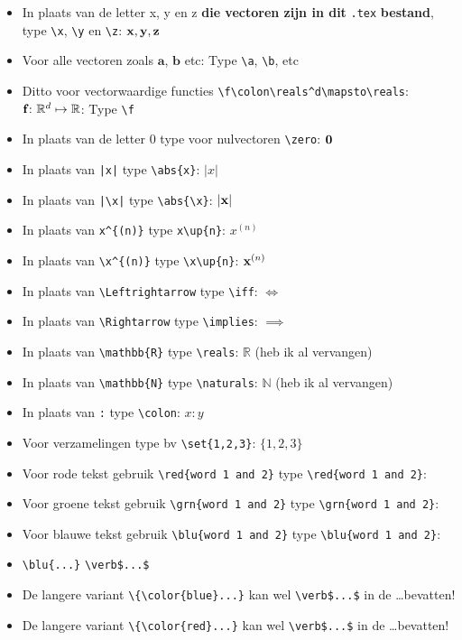 \documentclass[a4paper]{exam}
\theoremstyle{definition}
\newcommand{\naturals}{\mathbb{N}}
\newcommand{\reals}{\mathbb{R}}
\def\set#1{\lbrace#1\rbrace}
\def\abs#1{{\left|#1\right|}}
\def\up#1{^{(#1)}}
\begin{document}
\begin{itemize}
\item In plaats van de letter x, y en z \textbf{die vectoren zijn in dit} \verb$.tex$ \textbf{bestand}, type
\verb$\x$, \verb$\y$ en \verb$\z$: ${\textbf{x}}, {\textbf{y}}, {\textbf{z}}$
\item Voor alle vectoren zoals $\mathbf{a}$, $\mathbf{b}$ etc: Type \verb$\a$, \verb$\b$, etc
\item Ditto voor vectorwaardige functies \verb$\f\colon\reals^d\mapsto\reals$: $\f\colon\reals^d\mapsto\reals$: Type \verb$\f$
\item In plaats van de letter 0 type voor nulvectoren \verb$\zero$: ${\textbf{0}}$
\item In plaats van \verb$|x|$ type \verb$\abs{x}$: $\abs{x}$
\item In plaats van \verb$|\x|$ type \verb$\abs{\x}$: $\abs{\x}$
\item In plaats van \verb$x^{(n)}$ type \verb$x\up{n}$: $x\up{n}$
\item In plaats van \verb$\x^{(n)}$ type \verb$\x\up{n}$: $\x\up{n}$
\item In plaats van \verb$\Leftrightarrow$ type \verb$\iff$: $\iff$
\item In plaats van \verb$\Rightarrow$ type \verb$\implies$: $\implies$
\item In plaats van \verb$\mathbb{R}$ type \verb$\reals$: $\reals$ (heb ik al vervangen)
\item In plaats van \verb$\mathbb{N}$ type \verb$\naturals$: $\naturals$ (heb ik al vervangen)
\item In plaats van \verb$:$ type \verb$\colon$: $x\colon y$
\item Voor verzamelingen type bv \verb$\set{1,2,3}$: $\set{1,2,3}$
\item Voor rode tekst gebruik \verb$\red{word 1 and 2}$ type \verb$\red{word 1 and 2}$: 
\item Voor groene tekst gebruik \verb$\grn{word 1 and 2}$ type \verb$\grn{word 1 and 2}$: 
\item Voor blauwe tekst gebruik \verb$\blu{word 1 and 2}$ type \verb$\blu{word 1 and 2}$: 
\item {} \verb$\blu{...}$  \verb#\verb$...$# 
\item De langere variant \verb$\{\color{blue}...}$ kan wel \verb#\verb$...$# in de \dots bevatten!
\item De langere variant \verb$\{\color{red}...}$ kan wel \verb#\verb$...$# in de \dots bevatten!

\end{itemize}
\end{document}
